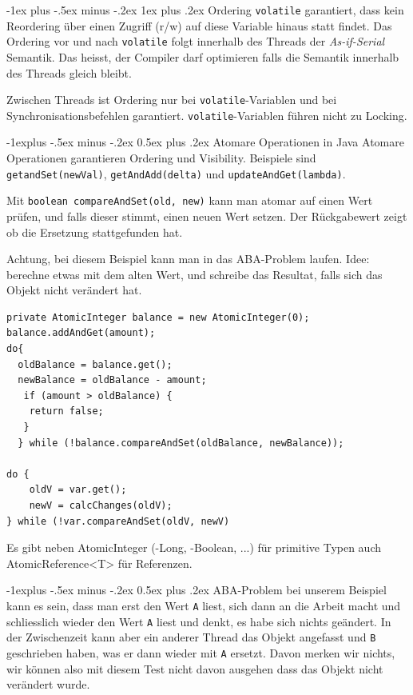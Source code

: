 \documentclass[a4paper, fontsize=6pt]{scrartcl}
\makeatletter
\renewcommand{\subsection}{\@startsection{subsection}{2}{0mm}%
    {-1explus -.5ex minus -.2ex}%
    {0.5ex plus .2ex}%
    {\normalfont\normalsize\bfseries}}
\renewcommand{\subsubsection}{\@startsection{subsubsection}{3}{0mm}%
    {-1ex plus -.5ex minus -.2ex}%
    {1ex plus .2ex}%
    {\normalfont\small\bfseries}}
\makeatother
\begin{document}
\begin{multicols*}{5}
\subsubsection{Ordering}
\texttt{volatile} garantiert, dass kein Reordering über einen Zugriff (r/w) auf diese Variable hinaus statt findet. Das Ordering vor und nach \texttt{volatile} folgt innerhalb des Threads der \textit{As-if-Serial} Semantik. Das heisst, der Compiler darf optimieren falls die Semantik innerhalb des Threads gleich bleibt.

Zwischen Threads ist Ordering nur bei \texttt{volatile}-Variablen und bei Synchronisationsbefehlen garantiert. \texttt{volatile}-Variablen führen nicht zu Locking.

\subsection{Atomare Operationen in Java}
Atomare Operationen garantieren Ordering und Visibility. Beispiele sind \texttt{getandSet(newVal)}, \texttt{getAndAdd(delta)} und \texttt{updateAndGet(lambda)}.

Mit \texttt{boolean compareAndSet(old, new)} kann man atomar auf einen Wert prüfen, und falls dieser stimmt, einen neuen Wert setzen. Der Rückgabewert zeigt ob die Ersetzung stattgefunden hat.

Achtung, bei diesem Beispiel kann man in das ABA-Problem laufen. Idee: berechne etwas mit dem alten Wert, und schreibe das Resultat, falls sich das Objekt nicht verändert hat.
\begin{verbatim}
private AtomicInteger balance = new AtomicInteger(0);
balance.addAndGet(amount);
do{
  oldBalance = balance.get();
  newBalance = oldBalance - amount;
   if (amount > oldBalance) {
    return false;
   }
  } while (!balance.compareAndSet(oldBalance, newBalance));

do {
    oldV = var.get();
    newV = calcChanges(oldV);
} while (!var.compareAndSet(oldV, newV)
\end{verbatim}

Es gibt neben AtomicInteger (-Long, -Boolean, ...) für primitive Typen auch AtomicReference<T> für Referenzen.

\subsection{ABA-Problem}
bei unserem Beispiel kann es sein, dass man erst den Wert \texttt{A} liest, sich dann an die Arbeit macht und schliesslich wieder den Wert \texttt{A} liest und denkt, es habe sich nichts geändert. In der Zwischenzeit kann aber ein anderer Thread das Objekt angefasst und \texttt{B} geschrieben haben, was er dann wieder mit \texttt{A} ersetzt. Davon merken wir nichts, wir können also mit diesem Test nicht davon ausgehen dass das Objekt nicht verändert wurde.


\end{multicols*}
\end{document}
